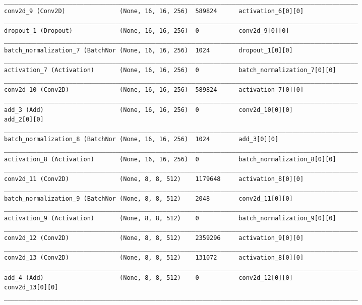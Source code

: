 \documentclass[12pt]{article}
\begin{document}
\begin{adjustwidth}{-50pt}{0pt}
\begin{Verbatim}
__________________________________________________________________________________________________
conv2d_9 (Conv2D)               (None, 16, 16, 256)  589824      activation_6[0][0]
__________________________________________________________________________________________________
dropout_1 (Dropout)             (None, 16, 16, 256)  0           conv2d_9[0][0]
__________________________________________________________________________________________________
batch_normalization_7 (BatchNor (None, 16, 16, 256)  1024        dropout_1[0][0]
__________________________________________________________________________________________________
activation_7 (Activation)       (None, 16, 16, 256)  0           batch_normalization_7[0][0]
__________________________________________________________________________________________________
conv2d_10 (Conv2D)              (None, 16, 16, 256)  589824      activation_7[0][0]
__________________________________________________________________________________________________
add_3 (Add)                     (None, 16, 16, 256)  0           conv2d_10[0][0]
add_2[0][0]
__________________________________________________________________________________________________
batch_normalization_8 (BatchNor (None, 16, 16, 256)  1024        add_3[0][0]
__________________________________________________________________________________________________
activation_8 (Activation)       (None, 16, 16, 256)  0           batch_normalization_8[0][0]
__________________________________________________________________________________________________
conv2d_11 (Conv2D)              (None, 8, 8, 512)    1179648     activation_8[0][0]
__________________________________________________________________________________________________
batch_normalization_9 (BatchNor (None, 8, 8, 512)    2048        conv2d_11[0][0]
__________________________________________________________________________________________________
activation_9 (Activation)       (None, 8, 8, 512)    0           batch_normalization_9[0][0]
__________________________________________________________________________________________________
conv2d_12 (Conv2D)              (None, 8, 8, 512)    2359296     activation_9[0][0]
__________________________________________________________________________________________________
conv2d_13 (Conv2D)              (None, 8, 8, 512)    131072      activation_8[0][0]
__________________________________________________________________________________________________
add_4 (Add)                     (None, 8, 8, 512)    0           conv2d_12[0][0]
conv2d_13[0][0]
__________________________________________________________________________________________________

\end{Verbatim}
\end{adjustwidth}
\end{document}
